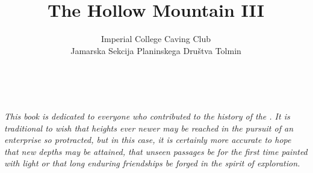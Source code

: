 \documentclass[symmetric, a4paper]{tufte-book}
\title{The Hollow Mountain III}
\author{Imperial College Caving Club \\ Jamarska Sekcija Planinskega Dru\v{s}tva Tolmin }
\begin{document}
\frontmatter 
\maketitle %

\justify

\cleardoublepage
~\vfill
\begin{doublespace}
\noindent\fontsize{12}{14}\selectfont\sffamily\slshape
\nohyphenation
This book is dedicated to everyone who contributed to the history of the . It is traditional to wish that heights ever newer may be reached in the pursuit of an enterprise so protracted, but in this case, it is certainly more accurate to hope that new depths may be attained,  that unseen passages  be for the first time painted with light  or that long enduring friendships be forged in the spirit of exploration. 

\end{doublespace}
\vfill
\vfill




\newpage




  	
% 	
%         	
% 	
% 	
	
% 	
% 	
	
   	
    

    
\end{document}
